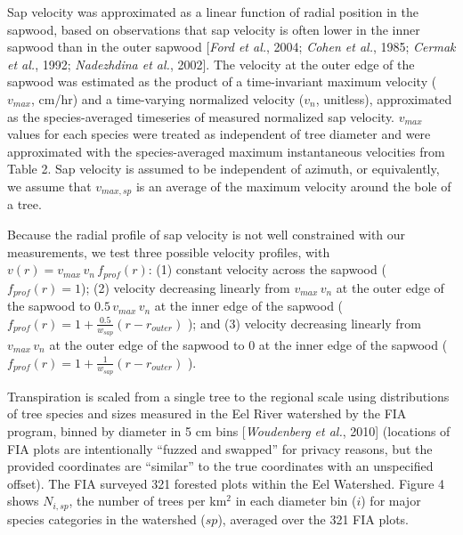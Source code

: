 Sap velocity was approximated as a linear function of radial position in the sapwood, based on observations that sap velocity is often lower in the inner sapwood than in the outer sapwood [\textit{Ford et al.}, 2004; \textit{Cohen et al.}, 1985; \textit{Cermak et al.}, 1992; \textit{Nadezhdina et al.}, 2002].  The velocity at the outer edge of the sapwood was estimated as the product of a time-invariant maximum velocity ($v_{max}$, cm/hr) and a time-varying normalized velocity ($v_n$, unitless), approximated as the species-averaged timeseries of measured normalized sap velocity.  $v_{max}$ values for each species were treated as independent of tree diameter and were approximated with the species-averaged maximum instantaneous velocities from Table 2.  Sap velocity is assumed to be independent of azimuth, or equivalently, we assume that $v_{max,sp}$ is an average of the maximum velocity around the bole of a tree.

Because the radial profile of sap velocity is not well constrained with our measurements, we test three possible velocity profiles, with $v(r) = v_{max} \, v_n \, f_{prof}(r)$: (1) constant velocity across the sapwood ($f_{prof}(r) = 1$); (2) velocity decreasing linearly from $v_{max} \, v_n$ at the outer edge of the sapwood to $0.5 \, v_{max} \, v_n$ at the inner edge of the sapwood ($f_{prof}(r) = 1+\tfrac{0.5}{w_{sap}}(r-r_{outer})$ ); and (3) velocity decreasing linearly from $v_{max} \, v_n$ at the outer edge of the sapwood to 0 at the inner edge of the sapwood ($f_{prof}(r) = 1+\tfrac{1}{w_{sap}}(r-r_{outer})$ ).

Transpiration is scaled from a single tree to the regional scale using distributions of tree species and sizes measured in the Eel River watershed by the FIA program, binned by diameter in 5 cm bins [\textit{Woudenberg et al.}, 2010] (locations of FIA plots are intentionally ``fuzzed and swapped'' for privacy reasons, but the provided coordinates are ``similar'' to the true coordinates with an unspecified offset).  The FIA surveyed 321 forested plots within the Eel Watershed.  Figure 4 shows $N_{i,sp}$, the number of trees per km$^2$ in each diameter bin ($i$) for major species categories in the watershed ($sp$), averaged over the 321 FIA plots.

